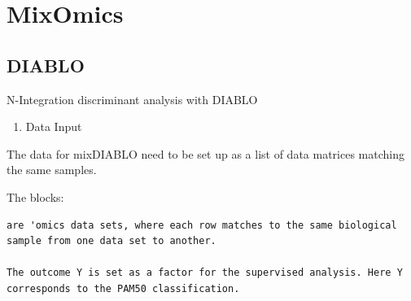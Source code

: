 \documentclass[
]{book}
\providecommand{\tightlist}{%
  \setlength{\itemsep}{0pt}\setlength{\parskip}{0pt}}
\begin{document}
\hypertarget{mixomics}{%
\section{MixOmics}\label{mixomics}}

\hypertarget{diablo}{%
\subsection{DIABLO}\label{diablo}}

N-Integration discriminant analysis with DIABLO

\begin{enumerate}
\def\labelenumi{\arabic{enumi})}
\tightlist
\item
  Data Input
\end{enumerate}

The data for mixDIABLO need to be set up as a list of data matrices matching the same samples.

The blocks:

\begin{verbatim}
are 'omics data sets, where each row matches to the same biological sample from one data set to another.

The outcome Y is set as a factor for the supervised analysis. Here Y corresponds to the PAM50 classification.
\end{verbatim}
\end{document}

